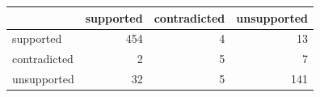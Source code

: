 \begin{tabular}{@{}lrrr@{}}
\toprule
 & supported & contradicted & unsupported \\
\midrule
supported & 454 & 4 & 13 \\
contradicted & 2 & 5 & 7 \\
unsupported & 32 & 5 & 141 \\
\bottomrule
\end{tabular}
